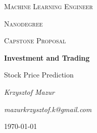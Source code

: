 \begin{titlepage}
	\centering
	{\scshape\LARGE Machine Learning Engineer\par}
	{\scshape\LARGE Nanodegree\par}
	\vspace{1cm}
	{\scshape\Large Capstone Proposal\par}
	\vspace{2cm}
	
	\noindent\makebox[\linewidth]{\rule{\textwidth}{0.4pt}}
	
	\vspace{0.8cm} 
	{\huge\bfseries Investment and Trading\par}
	\vspace{0.4cm} 
	{\large Stock Price Prediction\par}
	\vspace{0.8cm} 
	\noindent\makebox[\linewidth]{\rule{\textwidth}{0.4pt}}
		
	\vspace{2cm}
	{\Large\itshape Krzysztof Mazur\par}
	\vspace{0.4cm} 
	{\large\itshape mazurkrzysztof.k@gmail.com\par}
	\vfill
	
	{\large \today\par}
\end{titlepage}
\restoregeometry
